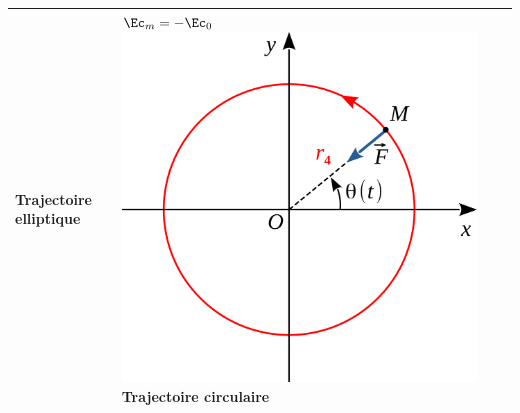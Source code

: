 \documentclass[../../main/main.tex]{subfiles}
\begin{document}
\begin{table}[h]
\begin{tabularx}{\linewidth}{llYY}
		Trajectoire \textbf{elliptique}
		                   &
		$\Ec_m = -\Ec_0$
		\smallbreak\includegraphics[scale=.6]{traj_att-color_cer}\smallbreak
		Trajectoire \textbf{circulaire}
		\\\bottomrule
	\end{tabularx}
\end{table}
\end{document}
